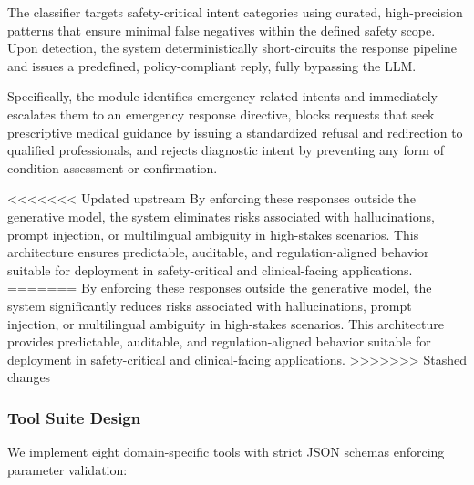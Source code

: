 \documentclass[conference]{IEEEtran}
\begin{document}
The classifier targets safety-critical intent categories using curated, high-precision patterns that ensure minimal false negatives within the defined safety scope. Upon detection, the system deterministically short-circuits the response pipeline and issues a predefined, policy-compliant reply, fully bypassing the LLM.

Specifically, the module identifies emergency-related intents and immediately escalates them to an emergency response directive, blocks requests that seek prescriptive medical guidance by issuing a standardized refusal and redirection to qualified professionals, and rejects diagnostic intent by preventing any form of condition assessment or confirmation.

<<<<<<< Updated upstream
By enforcing these responses outside the generative model, the system eliminates risks associated with hallucinations, prompt injection, or multilingual ambiguity in high-stakes scenarios. This architecture ensures predictable, auditable, and regulation-aligned behavior suitable for deployment in safety-critical and clinical-facing applications.
=======
By enforcing these responses outside the generative model, the system significantly reduces risks associated with hallucinations, prompt injection, or multilingual ambiguity in high-stakes scenarios. This architecture provides predictable, auditable, and regulation-aligned behavior suitable for deployment in safety-critical and clinical-facing applications.
>>>>>>> Stashed changes

\subsubsection{Tool Suite Design}
We implement eight domain-specific tools with strict JSON schemas enforcing parameter validation:
\end{document}
